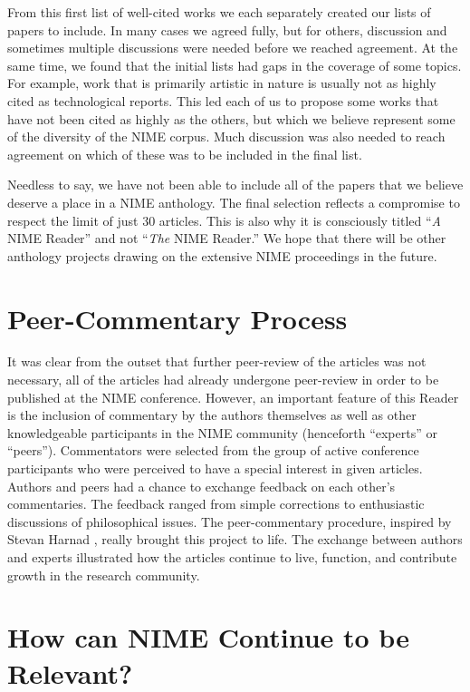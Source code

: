 From this first list of well-cited works we each separately created our lists of papers to include. In many cases we agreed fully, but for others, discussion and sometimes multiple discussions were needed before we reached agreement. At the same time, we found that the initial lists had gaps in the coverage of some topics. For example, work that is primarily artistic in nature is usually not as highly cited as technological reports. This led each of us to propose some works that have not been cited as highly as the others, but which we believe represent some of the diversity of the NIME corpus. Much discussion was also needed to reach agreement on which of these was to be included in the final list.

Needless to say, we have not been able to include all of the papers that we believe deserve a place in a NIME anthology. The final selection reflects a compromise to respect the limit of just 30 articles. This is also why it is consciously titled ``\emph{A} NIME Reader'' and not ``\emph{The} NIME Reader.'' We hope that there will be other anthology projects drawing on the extensive NIME proceedings in the future. 


\section*{Peer-Commentary Process}

It was clear from the outset that further peer-review of the articles was not necessary, all of the articles had already undergone peer-review in order to be published at the NIME conference. However, an important feature of this Reader is the inclusion of commentary by the authors themselves as well as other knowledgeable participants in the NIME community (henceforth ``experts'' or ``peers''). Commentators were selected from the group of active conference participants who were perceived to have a special interest in given articles. Authors and peers had a chance to exchange feedback on each other's commentaries. The feedback ranged from simple corrections to enthusiastic discussions of philosophical issues. The peer-commentary procedure, inspired by Stevan Harnad \cite{Harnad:2000}, really brought this project to life. The exchange between authors and experts illustrated how the articles continue to live, function, and contribute growth in the research community.

\section*{How can NIME Continue to be Relevant?}

